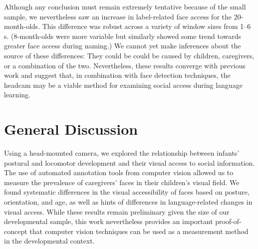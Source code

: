 \documentclass[man,noapacite]{apa2}
\begin{document}
Although any conclusion must remain extremely tentative because of the small sample, we nevertheless saw an increase in label-related face access for the 20-month-olds. This difference was robust across a variety of window sizes from 1--6 s. (8-month-olds were more variable but similarly showed some trend towards greater face access during naming.) We cannot yet make inferences about the source of these differences: They could be could be caused by children, caregivers, or a combination of the two. Nevertheless, these results converge with previous work and suggest that, in combination with face detection techniques, the headcam may be a viable method for examining social access during language learning.


\section{General Discussion}

Using a head-mounted camera, we explored the relationship between infants' postural and locomotor development and their visual access to social information. The use of automated annotation tools from computer vision allowed us to measure the prevalence of caregivers' faces in their children's visual field. We found systematic differences in the visual accessibility of faces based on posture, orientation, and age, as well as hints of differences in language-related changes in visual access. While these results remain preliminary given the size of our developmental sample, this work nevertheless provides an important proof-of-concept that computer vision techniques can be used as a measurement method in the developmental context. 
\end{document}
